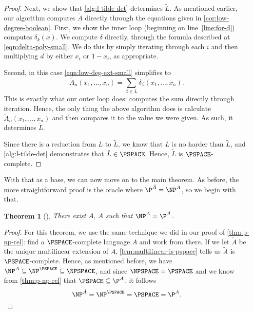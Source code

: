 \documentclass[english]{reedthesis}
\theoremstyle{plain}
\newtheorem{thm}{Theorem}[section]
\theoremstyle{definition}
\theoremstyle{remark}
\begin{document}
\begin{proof}
  Next, we show that \cref{alg:l-tilde-det} determines $\tilde{L}$. As mentioned
  earlier, our algorithm computes $\tilde{A}$ directly through the equations
  given in \cref{cor:low-degree-boolean}. First, we show the inner loop
  (beginning on line~\ref{line:for-d}) computes $\delta_{k}(x)$. We compute $\delta$
  directly, through the formula described at \cref{eqn:delta-poly-small}. We do
  this by simply iterating through each $i$ and then multiplying $d$ by either
  $x_{i}$ or $1-x_{i}$, as appropriate.

  Second, in this case \cref{eqn:low-deg-ext-small} simplifies to
  \begin{equation}
    \tilde{A}_{n}(x_{1}, \ldots, x_{n}) = \sum_{\beta \in L}\delta_{\beta}(x_{1}, \ldots, x_{n}).
  \end{equation}
  This is exactly what our outer loop does: computes the sum directly through
  iteration.
  Hence, the only thing the above algorithm does is calculate
  $\tilde{A}_{n}(x_{1}, \ldots, x_{n})$ and then compares it to the value we were
  given. As such, it determines $\tilde{L}$.

  Since there is a reduction from $L$ to $\tilde{L}$, we know that $L$ is no
  harder than $\tilde{L}$, and \cref{alg:l-tilde-det} demonstrates that
  $\tilde{L} \in \PSPACE$. Hence, $\tilde{L}$ is $\PSPACE$-complete.
\end{proof}

With that as a base, we can now move on to the main theorem. As before, the more
straightforward proof is the oracle where $\P^{\tilde{A}} = \NP^{A}$, so we
begin with that.

\begin{thm}[{\cite[Theorem 5.1]{AW09}}]\label{thm:p-np-alg}
  There exist $A$, $\tilde{A}$ such that $\NP^{A} = \P^{\tilde{A}}$.
\end{thm}

\begin{proof}
  For this theorem, we use the same technique we did in our proof of
  \cref{thm:p-np-rel}: find a $\PSPACE$-complete language $A$ and work from
  there. If we let $\tilde{A}$ be the unique multilinear extension of $A$,
  \cref{lem:multilinear-is-pspace} tells us $\tilde{A}$ is $\PSPACE$-complete.
  Hence, as mentioned before, we have
  $\NP^{\tilde{A}} \subseteq \NP^{\PSPACE} \subseteq \NPSPACE$, and since $\NPSPACE = \PSPACE$
  and we know from \cref{thm:p-np-rel} that $\PSPACE \subseteq \P^{A}$, it follows
  \begin{equation*}
    \NP^{\tilde{A}} = \NP^{\PSPACE} = \PSPACE = \P^{A}.
  \end{equation*}
\end{proof}
\end{document}
